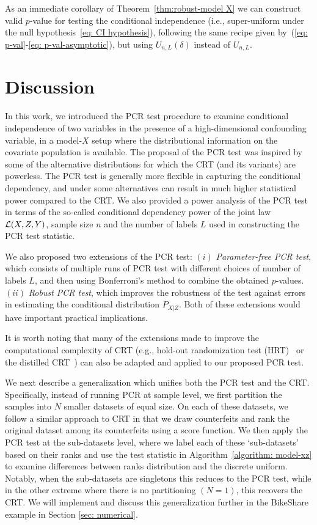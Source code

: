 \documentclass[11pt]{article}
\begin{document}
As an immediate corollary of Theorem~\ref{thm:robust-model X} we can construct valid $p$-value for testing the conditional independence (i.e., super-uniform under the null hypothesis~\eqref{eq: CI hypothesis}), following the same recipe given by~(\ref{eq: p-val}-\ref{eq: p-val-asymptotic}), but using $U_{n,L}(\delta)$ instead of $U_{n,L}$.

\section{Discussion}\label{sec:discussion}
In this work, we introduced the PCR test procedure to examine conditional independence of two variables in the presence of a high-dimensional confounding variable, in a model-$X$ setup where the distributional information on the covariate population is available.  The proposal of the PCR test was inspired by some of the alternative distributions for which the CRT (and its variants) are powerless. The PCR test is generally more flexible in capturing the conditional dependency, and under some alternatives can result in much higher statistical power compared to the CRT. We also provided a power analysis of the PCR test  in terms of the so-called conditional dependency power of the joint law $\mathcal{L}(X,Z,Y)$, sample size $n$ and the number of labels $L$ used in constructing the PCR test statistic.  

We also proposed two extensions of the PCR test: $(i)$ \emph{Parameter-free PCR test}, which consists of multiple runs of PCR test with different choices of number of labels $L$, and then using Bonferroni's method to combine the obtained $p$-values. $(ii)$    \emph{Robust PCR test}, which improves the robustness of the test against errors in estimating the conditional distribution $P_{X|Z}$.  Both of these extensions would have important practical implications. 

It is worth noting that many of the extensions made to improve the computational complexity of CRT (e.g., hold-out randomization test (HRT)~\cite{tansey2018holdout} or the distilled CRT~\cite{liu2020fast}) can also be adapted and applied to our proposed PCR test.

We next describe a generalization which unifies both the PCR test and the CRT. Specifically, instead of running PCR at sample level, we first partition the samples into $N$ smaller datasets of equal size. On each of these datasets, we follow a similar approach to CRT in that we draw counterfeits  and rank the original dataset among its counterfeits using a score function. We then apply the PCR test at the sub-datasets level, where we label each of these `sub-datasets' based on their ranks and use the test statistic in Algorithm~\ref{algorithm: model-xz} to examine differences between ranks distribution and the discrete uniform. Notably, when the sub-datasets are singletons this reduces to the PCR test, while in the other extreme where there is no partitioning $(N=1)$, this recovers the CRT. We will implement and discuss this generalization further in the BikeShare example in  Section \ref{sec: numerical}.  
\end{document}
